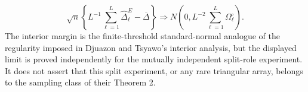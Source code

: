 \[
\sqrt n\left\{L^{-1}\sum_{\ell=1}^{L}\widehat\Delta^E_{\ell}-\overline\Delta\right\}
\Rightarrow N\!\left(0,L^{-2}\sum_{\ell=1}^{L}\Omega^{\circ}_{\ell}\right).
\]
The interior margin is the finite-threshold standard-normal analogue of the regularity imposed in Djuazon and Tsyawo's interior analysis, but the displayed limit is proved independently for the mutually independent split-role experiment. It does not assert that this split experiment, or any rare triangular array, belongs to the sampling class of their Theorem 2.
